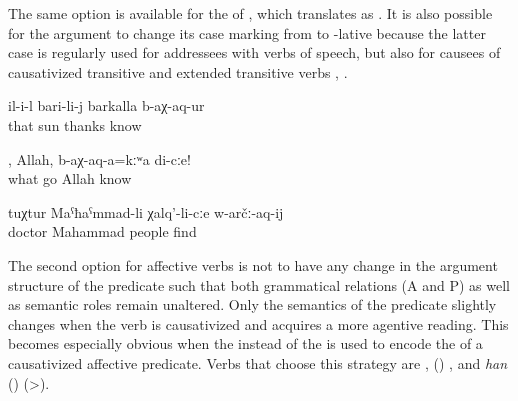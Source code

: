 The same option is available for the  of , which translates as  . It is also possible for the  argument to change its case marking from  to -lative because the latter case is regularly used for addressees with verbs of speech, but also for causees of causativized transitive and extended transitive verbs , .

\begin{exe}
	\ex	\label{ex:‎He thanked the sun}
	\gll	il-i-l	bari-li-j	barkalla	b-aχ-aq-ur\\
		that	sun	thanks	know\\
	\glt	{}

	\ex	\label{ex:Allah, tell me what happened}
	\gll	[ce	ag-ur=el],	Allah,	b-aχ-aq-a=kːʷa	di-cːe!\\
		what	go	Allah	know	\\
	\glt	{}

	\ex	\label{ex:(that) doctor Mahammad makes the people find (him)}
	\gll	tuχtur	Maˁħaˁmmad-li	χalq'-li-cːe	w-arčː-aq-ij\\
		doctor	Mahammad	people	find\\
	\glt	{}
\end{exe}

The second option for affective verbs is not to have any change in the argument structure of the predicate such that both grammatical relations (A and P) as well as semantic roles remain unaltered. Only the semantics of the predicate slightly changes when the verb is causativized  and acquires a more agentive reading. This becomes especially obvious when the  instead of the  is used to encode the  of a causativized affective predicate. Verbs that choose this strategy are  ,  () , and \textit{han}  ()  (>).

